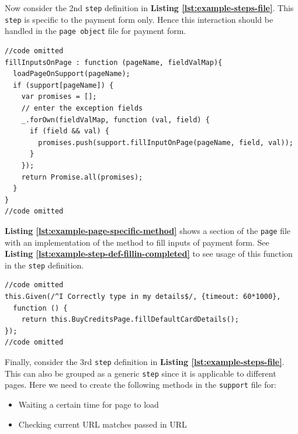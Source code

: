 Now consider the 2nd \texttt{step} definition in \textbf{Listing \ref{lst:example-steps-file}}. This \texttt{step} is specific to the payment form only. Hence this interaction should be handled in the \texttt{page object} file for payment form.

\begin{listing}[H]
\begin{verbatim}
//code omitted
fillInputsOnPage : function (pageName, fieldValMap){
  loadPageOnSupport(pageName);
  if (support[pageName]) {
    var promises = [];
    // enter the exception fields
    _.forOwn(fieldValMap, function (val, field) {
      if (field && val) {
        promises.push(support.fillInputOnPage(pageName, field, val));
      }
    });
    return Promise.all(promises);
  }
}
//code omitted
\end{verbatim}
\label{lst:example-page-specific-method}
\end{listing}

\textbf{Listing \ref{lst:example-page-specific-method}} shows a section of the \texttt{page} file with an implementation of the method to fill inputs of payment form. See \textbf{Listing \ref{lst:example-step-def-fillin-completed}} to see usage of this function in the \texttt{step} definition.

\begin{listing}[H]
\begin{verbatim}
//code omitted
this.Given(/^I Correctly type in my details$/, {timeout: 60*1000},
  function () {
    return this.BuyCreditsPage.fillDefaultCardDetails();
});
//code omitted
\end{verbatim}
\label{lst:example-step-def-fillin-completed}
\end{listing}

Finally, consider the 3rd \texttt{step} definition in \textbf{Listing \ref{lst:example-steps-file}}. This can also be grouped as a generic \texttt{step} since it is applicable to different pages. Here we need to create the following methods in the \texttt{support} file for:

\begin{itemize}
\item Waiting a certain time for page to load
\item Checking current URL matches passed in URL
\end{itemize}

